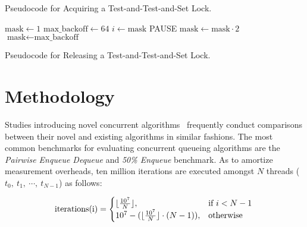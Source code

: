 \begin{algorithm}
    \caption{Pseudocode for Acquiring a Test-and-Test-and-Set Lock.}\label{alg:ttas_acquire}
    \begin{algorithmic}[1]
        \State $\text{mask} \gets 1$
        \State $\text{max\_backoff} \gets 64$
        \Repeat
                \State $i \gets \text{mask}$
                    \State PAUSE 
                \EndFor
                    \State $\text{mask} \gets \text{mask} \cdot 2$
                \Else
                    \State $\text{mask} \gets \text{max\_backoff}$
                \EndIf

            \EndWhile

        \State \Return {}
    \end{algorithmic}
\end{algorithm}

\begin{algorithm}
    \caption{Pseudocode for Releasing a Test-and-Test-and-Set Lock.}\label{alg:ttas_release}
    \begin{algorithmic}[1]
        \State {}
    \end{algorithmic}
\end{algorithm}

\section{Methodology}

Studies introducing novel concurrent
algorithms~\citep{michael1996simple,valois1994queues,kogan2011wait,hoffman2007baskets,yang2016wait}
frequently conduct comparisons between their novel and existing algorithms in
similar fashions. The most common benchmarks for evaluating concurrent queueing
algorithms are the \emph{Pairwise Enqueue Dequeue} and \emph{50\% Enqueue}
benchmark. As to amortize measurement overheads, ten million iterations are
executed amongst $N$ threads ($t_0,~t_1,~\cdots,~t_{N-1}$) as follows: 

\[
    \text{iterations(i)} = 
    \begin{cases}
        \lfloor\frac{10^7}{N}\rfloor, & \text{if}~i < N-1 \\
        10^7 - (\lfloor \frac{10^7}{N} \rfloor \cdot (N-1)), & \text{otherwise}
    \end{cases} \\
\]

